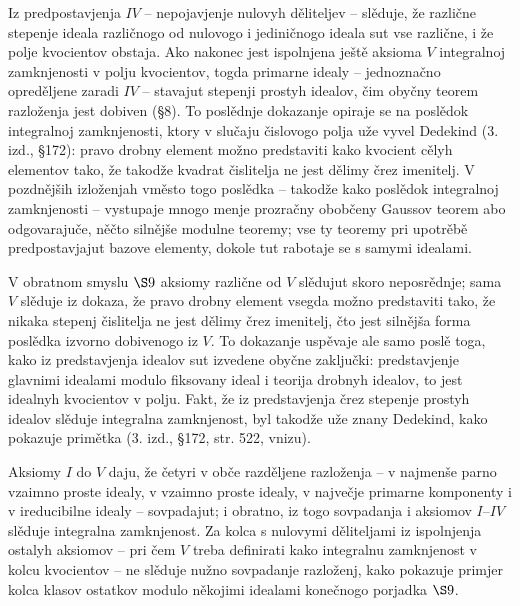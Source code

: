 \documentclass[11pt]{article}
\begin{document}
Iz predpostavjenja $IV$ -- nepojavjenje nulovyh děliteljev -- slěduje, že različne stepenje ideala različnogo od nulovogo i jediničnogo ideala sut vse različne, i že polje kvocientov obstaja. Ako nakonec jest ispolnjena ještě aksioma $V$ integralnoj zamknjenosti v polju kvocientov, togda primarne idealy -- jednoznačno opreděljene zaradi $IV$ -- stavajut stepenji prostyh idealov, čim obyčny teorem razloženja jest dobiven (§8). To poslědnje dokazanje opiraje se na poslědok integralnoj zamknjenosti, ktory v slučaju čislovogo polja uže vyvel Dedekind (3. izd., §172): pravo drobny element možno predstaviti kako kvocient cělyh elementov tako, že takodže kvadrat čislitelja ne jest dělimy črez imenitelj. V pozdnějših izloženjah vměsto togo poslědka -- takodže kako poslědok integralnoj zamknjenosti -- vystupaje mnogo menje prozračny obobčeny Gaussov teorem abo odgovarajuče, něčto silnějše modulne teoremy; vse ty teoremy pri upotrěbě predpostavjajut bazove elementy, dokole tut rabotaje se s samymi idealami.

V obratnom smyslu \hbox{\(\S 9\)} aksiomy različne od $V$ slědujut skoro neposrědnje; sama $V$ slěduje iz dokaza, že pravo drobny element vsegda možno predstaviti tako, že nikaka stepenj čislitelja ne jest dělimy črez imenitelj, čto jest silnějša forma poslědka izvorno dobivenogo iz $V$. To dokazanje uspěvaje ale samo poslě toga, kako iz predstavjenja idealov sut izvedene obyčne zaključki: predstavjenje glavnimi idealami modulo fiksovany ideal i teorija drobnyh idealov, to jest idealnyh kvocientov v polju. Fakt, že iz predstavjenja črez stepenje prostyh idealov slěduje integralna zamknjenost, byl takodže uže znany Dedekind, kako pokazuje primětka (3. izd., §172, str. 522, vnizu).

Aksiomy $I$ do $V$ daju, že četyri v obče razděljene razloženja -- v najmenše parno vzaimno proste idealy, v vzaimno proste idealy, v največje primarne komponenty i v ireducibilne idealy -- sovpadajut; i obratno, iz togo sovpadanja i aksiomov $I$--$IV$ slěduje integralna zamknjenost. Za kolca s nulovymi děliteljami iz ispolnjenja ostalyh aksiomov -- pri čem $V$ treba definirati kako integralnu zamknjenost v kolcu kvocientov -- ne slěduje nužno sovpadanje razloženj, kako pokazuje primjer kolca klasov ostatkov modulo někojimi idealami konečnogo porjadka \hbox{\(\S 9\)}.
\end{document}
